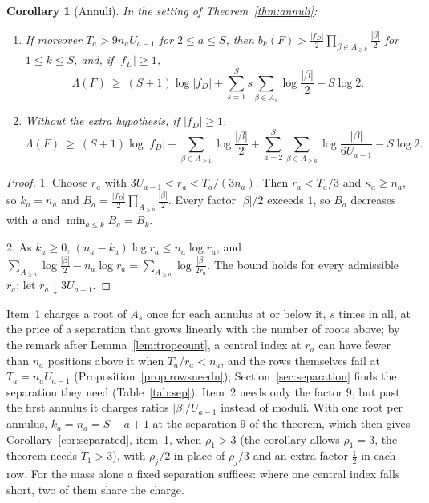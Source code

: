 \documentclass[11pt]{article}
\newtheorem{corollary}[theorem]{Corollary}
\begin{document}
\begin{corollary}[Annuli]\label{cor:annuli}
In the setting of Theorem~\ref{thm:annuli}:
\begin{enumerate}
\item If moreover $T_a>9n_aU_{a-1}$ for $2\le a\le S$, then
$b_k(F)>\frac{|f_D|}2\prod_{\beta\in A_{\ge k}}\frac{|\beta|}2$ for $1\le k\le S$,
and, if $|f_D|\ge1$,
\[
  \Lambda(F)\ \ge\ (S+1)\log|f_D|+\sum_{s=1}^Ss\sum_{\beta\in A_s}\log\frac{|\beta|}2-S\log2 .
\]
\item Without the extra hypothesis, if $|f_D|\ge1$,
\[
  \Lambda(F)\ \ge\ (S+1)\log|f_D|+\sum_{\beta\in A_{\ge1}}\log\frac{|\beta|}2
  +\sum_{a=2}^S\sum_{\beta\in A_{\ge a}}\log\frac{|\beta|}{6U_{a-1}}-S\log2 .
\]
\end{enumerate}
\end{corollary}

\begin{proof}
1.  Choose $r_a$ with $3U_{a-1}<r_a<T_a/(3n_a)$.  Then $r_a<T_a/3$ and
$\kappa_a\ge n_a$, so $k_a=n_a$ and
$B_a=\frac{|f_D|}2\prod_{A_{\ge a}}\frac{|\beta|}2$.  Every factor
$|\beta|/2$ exceeds $1$, so $B_a$ decreases with $a$ and
$\min_{a\le k}B_a=B_k$.

2.  As $k_a\ge0$, $(n_a-k_a)\log r_a\le n_a\log r_a$, and
$\sum_{A_{\ge a}}\log\frac{|\beta|}2-n_a\log r_a=\sum_{A_{\ge a}}\log\frac{|\beta|}{2r_a}$.
The bound holds for every admissible $r_a$; let $r_a\downarrow3U_{a-1}$.
\end{proof}

Item~1 charges a root of $A_s$ once for each annulus at or below it, $s$
times in all, at the price of a separation that grows linearly with the
number of roots above; by the remark after Lemma~\ref{lem:tropcount}, a
central index at $r_a$ can have fewer than $n_a$ positions above it when
$T_a/r_a<n_a$, and the rows themselves fail at $T_a=n_aU_{a-1}$
(Proposition~\ref{prop:rowsneedn}); Section~\ref{sec:separation} finds the
separation they need (Table~\ref{tab:sep}).  Item~2 needs only the factor $9$, but past the first
annulus it charges ratios $|\beta|/U_{a-1}$ instead of moduli.  With one root
per annulus, $k_a=n_a=S-a+1$ at the separation $9$ of the theorem, which then
gives Corollary~\ref{cor:separated}, item~1, when $\rho_1>3$ (the corollary
allows $\rho_1=3$, the theorem needs $T_1>3$), with $\rho_j/2$ in place of
$\rho_j/3$ and an extra factor $\frac12$ in each row.  For the mass alone a
fixed separation suffices: where one central index falls short, two of them
share the charge.
\end{document}
